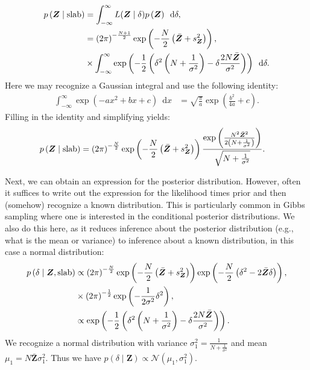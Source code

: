 \documentclass[a4paper]{article}
\newcommand{\shypo}[1]{%
	\ifnum#1>0%
		\mathrm{slab}
	\else%
		\mathrm{spike}
	\fi%
}
\newcommand{\dataZ}	{\bm{Z}}
\newcommand{\meanZ}	{\bar{\dataZ}}
\newcommand{\varZ}	{s_{\dataZ}^2}
\newcommand{\probp}[1]{p\left(#1\right)}
\newcommand{\lik}{L}
\newcommand{\dnorm}[2]{\mathcal{N}\left(#1, #2\right)}
\newcommand{\dx}[1]{\enspace\mathrm{d}{#1}}
\newenvironment{revision}{\color{teal}}{\color{black}}
\begin{document}
\begin{revision}
\begin{align*}
	\probp{\dataZ\mid\shypo{1}} &=\int_{-\infty}^{\infty} \lik(\dataZ \mid \delta) \probp{\dataZ} 	\dx{\delta},\\
	&=\left(2\pi\right)^{-\frac{N+1}{2}}
	\exp\left(-\frac{N}{2}\left(\meanZ + \varZ\right)\right), \\
	&\times\int_{-\infty}^{\infty}
	\exp\left(-\frac{1}{2}\left(\delta^2\left(N + \frac{1}{\sigma^2}\right) -\delta \frac{2N\meanZ}{\sigma^2}\right)\right)
	\dx{\delta}.
\end{align*}
Here we may recognize a Gaussian integral and use the following identity:
\begin{align*}
	\int_{-\infty}^{\infty}\exp\left(-ax^2+bx+c\right)\dx{x} &= \sqrt{\frac{\pi}{a}}\exp\left(\frac{b^2}{4a}+c\right).
\end{align*}
Filling in the identity and simplifying yields:
\begin{align*}
	\probp{\dataZ\mid\shypo{1}} &= 	
	\left(2\pi\right)^{-\frac{N}{2}}
	\exp\left(-\frac{N}{2}\left(\meanZ + \varZ\right)\right)
	\frac{
		\exp\left(\frac{N^2 \meanZ^2}{2\left(N+\frac{1}{\sigma^2}\right)}\right)
	}{
		\sqrt{N+\frac{1}{\sigma^2}}
	}.
\end{align*}

Next, we can obtain an expression for the posterior distribution. However, often it suffices to write out the expression for the likelihood times prior and then (somehow) recognize a known distribution. This is particularly common in Gibbs sampling where one is interested in the conditional posterior distributions. We also do this here, as it reduces inference about the posterior distribution (e.g., what is the mean or variance) to inference about a known distribution, in this case a normal distribution:
\begin{align*}
	\probp{\delta \mid \dataZ, \shypo{1}} &\propto  
	\left(2\pi\right)^{-\frac{N}{2}}
	\exp\left(-\frac{N}{2}\left(\meanZ + \varZ\right)\right) 
	\exp\left(-\frac{N}{2}\left(\delta^2 -2\meanZ\delta\right)\right),\\
	&\times \left(2\pi\right)^{-\frac{1}{2}} \exp\left(-\frac{1}{2\sigma^2}\delta^2\right), \\
	&\propto 
	\exp\left(-\frac{1}{2}\left(\delta^2\left(N + \frac{1}{\sigma^2}\right) -\delta \frac{2N\meanZ}{\sigma^2}\right)\right).
\end{align*}
We recognize a normal distribution with variance $\sigma_1^2 = \frac{1}{N + \frac{1}{\sigma^2}}$ and mean $\mu_1 = N\meanZ\sigma_1^2$. Thus we have $\probp{\delta \mid \dataZ} \propto \dnorm{\mu_1}{\sigma_1^2}$.


\end{revision}
\end{document}
